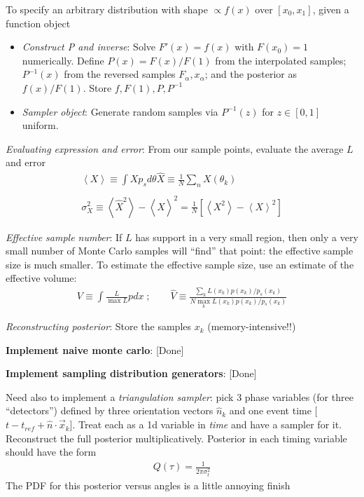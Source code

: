 \documentclass[twocolumn,prd,nofootinbib]{revtex4}
\newcommand\editremark[1]{{\color{red} #1}}
\begin{document}
\begin{widetext}
To specify an arbitrary distribution with shape $\propto f(x)$ over $[x_0,x_1]$, given a function object
\begin{itemize}
\item \emph{Construct P and inverse}: Solve $F'(x)=f(x)$ with $F(x_0)=1$ numerically.  Define $P(x)=F(x)/F(1)$ from the
  interpolated samples; $P^{-1}(x)$ from the reversed samples $F_\alpha,x_\alpha$; and the posterior as $f(x)/F(1)$.
  Store $f,F(1), P,P^{-1}$
\item \emph{Sampler object}: Generate random samples via $P^{-1}(z)$ for $z\in[0,1]$ uniform.
\end{itemize}

\emph{Evaluating expression and error}: From our sample points, evaluate the average $L$ and error
\begin{eqnarray}
\left< X \right> \equiv \int X p_s d\theta 
\hat{X} \equiv \frac{1}{N} \sum_n X(\theta_k)\\ \\
\sigma_X^2 \equiv \left<\hat{X}^2\right> -\left<\hat{X}\right>^2 
 = \frac{1}{N}[\left<X^2\right> - \left<X\right>^2] 
\end{eqnarray}


\noindent \emph{Effective sample number}: If $L$ has support in a very small region, then only a very small number of
Monte Carlo samples will ``find'' that point: the effective sample size is much smaller.
To estimate the effective sample size, use an estimate of the effective volume:
\begin{eqnarray}
V \equiv \int \frac{L}{\max L} p dx \; ; \qquad  \hat{V} \equiv \frac{\sum_k L(x_k) p(x_k)/p_s(x_k)}{N \max_k L(x_k) p(x_k)/p_s(x_k)}
\end{eqnarray}

\emph{Reconstructing posterior}: Store the samples $x_k$ (memory-intensive!!)

\noindent \textbf{Implement naive monte carlo}: [Done]

\noindent \textbf{Implement sampling distribution generators}: [Done]

Need also to implement a \emph{triangulation sampler}: pick 3 phase variables (for three ``detectors'') defined by three
orientation vectors $\hat{n}_k$ and one event time [$t-t_{ref} +\hat{n}\cdot \vec{x}_k$].  Treat each as a 1d variable
in \emph{time}
and have a sampler for it.  Reconstruct the full posterior multiplicatively.  Posterior in each timing variable should
have the form
\begin{eqnarray}
Q(\tau) = \frac{1}{2\pi \sigma_t^2}
\end{eqnarray}
The PDF for this posterior versus angles is a little annoying \editremark{finish}


\end{widetext}
\end{document}
